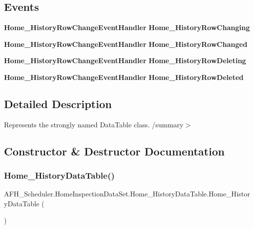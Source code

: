 \subsection*{Events}
\begin{DoxyCompactItemize}
\item 
\textbf{ Home\+\_\+\+History\+Row\+Change\+Event\+Handler} \textbf{ Home\+\_\+\+History\+Row\+Changing}
\item 
\textbf{ Home\+\_\+\+History\+Row\+Change\+Event\+Handler} \textbf{ Home\+\_\+\+History\+Row\+Changed}
\item 
\textbf{ Home\+\_\+\+History\+Row\+Change\+Event\+Handler} \textbf{ Home\+\_\+\+History\+Row\+Deleting}
\item 
\textbf{ Home\+\_\+\+History\+Row\+Change\+Event\+Handler} \textbf{ Home\+\_\+\+History\+Row\+Deleted}
\end{DoxyCompactItemize}


\subsection{Detailed Description}
Represents the strongly named Data\+Table class. /summary$>$ 

\subsection{Constructor \& Destructor Documentation}
\mbox{\label{class_a_f_h___scheduler_1_1_home_inspection_data_set_1_1_home___history_data_table_a4c4d0004c31933fe638d727aaf440b7b}} 
\subsubsection{Home\_HistoryDataTable()\hspace{0.1cm}{\footnotesize\ttfamily [1/2]}}
{\footnotesize\ttfamily A\+F\+H\+\_\+\+Scheduler.\+Home\+Inspection\+Data\+Set.\+Home\+\_\+\+History\+Data\+Table.\+Home\+\_\+\+History\+Data\+Table (\begin{DoxyParamCaption}{ }\end{DoxyParamCaption})}

\mbox{\label{class_a_f_h___scheduler_1_1_home_inspection_data_set_1_1_home___history_data_table_a6d0dc95d00700d8f81bfbd11fd0db04e}} 
